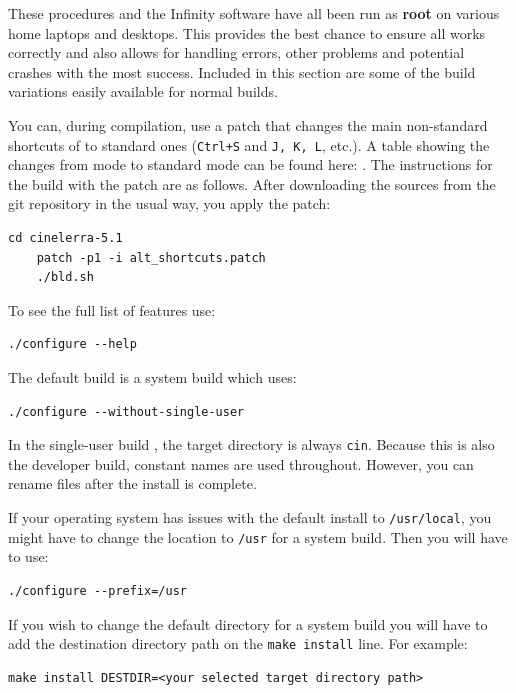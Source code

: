 These procedures and the \CGG{} Infinity software have all been run
as \textbf{root} on various home laptops and desktops. This provides
the best chance to ensure all works correctly and also allows for
handling errors, other problems and potential crashes with the most
success.  Included in this section are some of the build variations
easily available for normal builds.

You can, during compilation, use a patch that changes the main non-standard shortcuts of \CGG{} to standard ones (\texttt{Ctrl+S} and \texttt{J, K, L}, etc.). 
A table showing the changes from \CGG{} mode to standard mode can be found here: .
The instructions for the build with the patch are as follows. After downloading the sources from the git repository in the usual way, you apply the patch:

\begin{lstlisting}[style=sh]
	cd cinelerra-5.1
	patch -p1 -i alt_shortcuts.patch
	./bld.sh
\end{lstlisting}

To see the full list of features use:

\begin{lstlisting}[style=sh]
./configure --help
\end{lstlisting}
The default build  is a system build which uses:

\begin{lstlisting}[style=sh]
./configure --without-single-user
\end{lstlisting}

In the single-user build , the target directory is always
\texttt{cin}.  Because this is also the developer build, constant
names are used throughout.  However, you can rename files after the
install is complete.

If your operating system has issues with the default install to
\texttt{/usr/local}, you might have to change the location to
\texttt{/usr} for a system build.  Then you will have to use:
\begin{lstlisting}[style=sh]
./configure --prefix=/usr
\end{lstlisting}

If you wish to change the default directory for a system build you
will have to add the destination directory path on the \texttt{make
  install} line.  For example:
\begin{lstlisting}[style=sh]
make install DESTDIR=<your selected target directory path>
\end{lstlisting}

